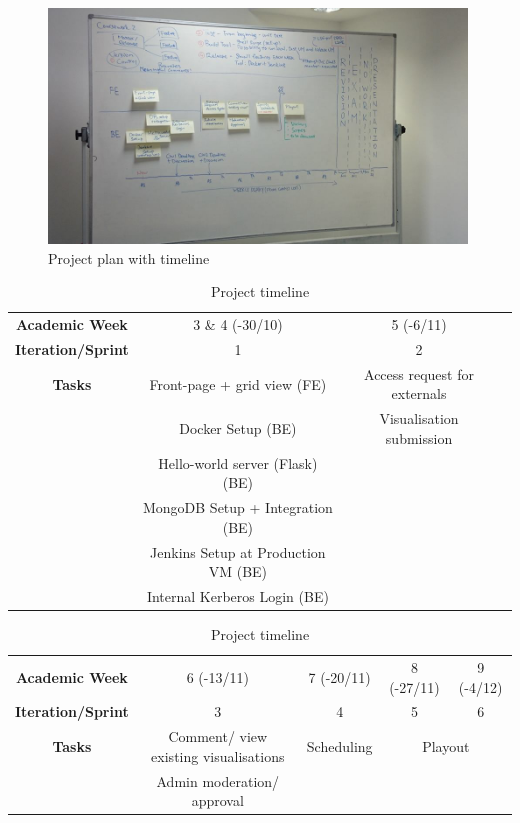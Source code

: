 \documentclass[a4paper]{article}
\begin{document}
\begin{figure}[h]
  \centering
    \includegraphics[width = 0.99\textwidth]{./planning/timeline.jpg}
   
  \caption{Project plan with timeline}
  \label{fig:timeline}
\end{figure}


\begin{table}[h]
  \begin{tabular}{c | c | c | c }
    \textbf{Academic Week} & 3 \& 4 (-30/10) & 5 (-6/11) \\
    \textbf{Iteration/Sprint} & 1 & 2 \\ \hline
    \textbf{Tasks} & Front-page + grid view (FE) & Access request for externals \\
          & Docker Setup (BE)           & Visualisation submission \\
          & Hello-world server (Flask) (BE) & \\
          & MongoDB Setup + Integration (BE) & \\
          & Jenkins Setup at Production VM (BE) & \\
          & Internal Kerberos Login (BE) & \\
  \end{tabular}

  \vspace{30pt}
  \begin{tabular}{c | c | c | c | c}
    \textbf{Academic Week} & 6 (-13/11) & 7 (-20/11) & 8 (-27/11) & 9 (-4/12) \\
    \textbf{Iteration/Sprint} & 3 & 4 & 5 & 6 \\ \hline
    \textbf{Tasks} & Comment/ view existing visualisations & Scheduling & 
            \multicolumn{2}{c}{Playout} \\
          & Admin moderation/ approval &  \\
  \end{tabular}
  \caption{Project timeline}
  \label{table:timeline}
\end{table}
\end{document}
